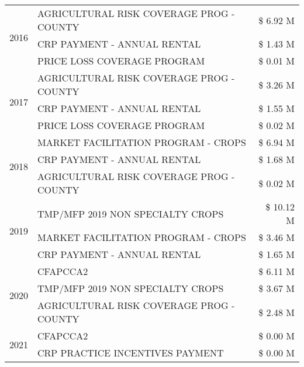 \begin{tabular}{llr}
\cline{1-3}
\multirow[t]{3}{*}{2016} & AGRICULTURAL RISK COVERAGE PROG - COUNTY      & \$ 6.92 M \\
 & CRP PAYMENT - ANNUAL RENTAL                   & \$ 1.43 M \\
 & PRICE LOSS COVERAGE PROGRAM                   & \$ 0.01 M \\
\cline{1-3}
\multirow[t]{3}{*}{2017} & AGRICULTURAL RISK COVERAGE PROG - COUNTY & \$ 3.26 M \\
 & CRP PAYMENT - ANNUAL RENTAL & \$ 1.55 M \\
 & PRICE LOSS COVERAGE PROGRAM & \$ 0.02 M \\
\cline{1-3}
\multirow[t]{3}{*}{2018} & MARKET FACILITATION PROGRAM - CROPS & \$ 6.94 M \\
 & CRP PAYMENT - ANNUAL RENTAL & \$ 1.68 M \\
 & AGRICULTURAL RISK COVERAGE PROG - COUNTY & \$ 0.02 M \\
\cline{1-3}
\multirow[t]{3}{*}{2019} & TMP/MFP 2019 NON SPECIALTY CROPS & \$ 10.12 M \\
 & MARKET FACILITATION PROGRAM - CROPS & \$ 3.46 M \\
 & CRP PAYMENT - ANNUAL RENTAL & \$ 1.65 M \\
\cline{1-3}
\multirow[t]{3}{*}{2020} & CFAPCCA2 & \$ 6.11 M \\
 & TMP/MFP 2019 NON SPECIALTY CROPS & \$ 3.67 M \\
 & AGRICULTURAL RISK COVERAGE PROG - COUNTY & \$ 2.48 M \\
\cline{1-3}
\multirow[t]{2}{*}{2021} & CFAPCCA2 & \$ 0.00 M \\
 & CRP PRACTICE INCENTIVES PAYMENT & \$ 0.00 M \\
\cline{1-3}
\bottomrule
\end{tabular}
